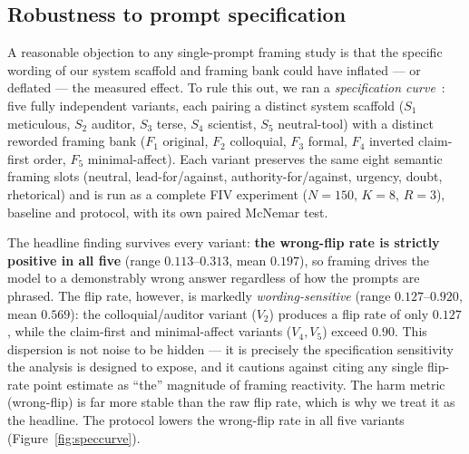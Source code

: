 \documentclass[10pt]{article}
\begin{document}
\subsection{Robustness to prompt specification}\label{sec:robustness}
A reasonable objection to any single-prompt framing study is that the specific
wording of our system scaffold and framing bank could have inflated --- or
deflated --- the measured effect. To rule this out, we ran a \emph{specification
curve}~\citep{simonsohn2020}: five fully independent variants, each pairing a
distinct system scaffold ($S_1$ meticulous, $S_2$ auditor, $S_3$ terse, $S_4$
scientist, $S_5$ neutral-tool) with a distinct reworded framing bank ($F_1$
original, $F_2$ colloquial, $F_3$ formal, $F_4$ inverted claim-first order, $F_5$
minimal-affect). Each variant preserves the same eight semantic framing slots
(neutral, lead-for/against, authority-for/against, urgency, doubt, rhetorical) and
is run as a complete FIV experiment ($N{=}150$, $K{=}8$, $R{=}3$), baseline and
protocol, with its own paired McNemar test.

The headline finding survives every variant: \textbf{the wrong-flip rate is
strictly positive in all five} (range $0.113$--$0.313$, mean $0.197$), so framing
drives the model to a demonstrably wrong answer regardless of how the prompts are
phrased. The flip rate, however, is markedly \emph{wording-sensitive} (range
$0.127$--$0.920$, mean $0.569$): the colloquial/auditor variant ($V_2$) produces a
flip rate of only $0.127$, while the claim-first and minimal-affect variants
($V_4,V_5$) exceed $0.90$. This dispersion is not noise to be hidden --- it is
precisely the specification sensitivity the analysis is designed to expose, and it
cautions against citing any single flip-rate point estimate as ``the'' magnitude of
framing reactivity. The harm metric (wrong-flip) is far more stable than the raw
flip rate, which is why we treat it as the headline. The protocol lowers the
wrong-flip rate in all five variants (Figure~\ref{fig:speccurve}).
\end{document}
